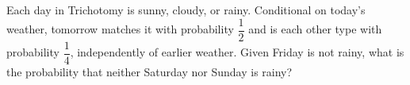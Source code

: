 Each day in Trichotomy is sunny, cloudy, or rainy. Conditional on today's weather, tomorrow matches it with probability $\dfrac{1}{2}$ and is each other type with probability $\dfrac{1}{4}$, independently of earlier weather. Given Friday is not rainy, what is the probability that neither Saturday nor Sunday is rainy?
